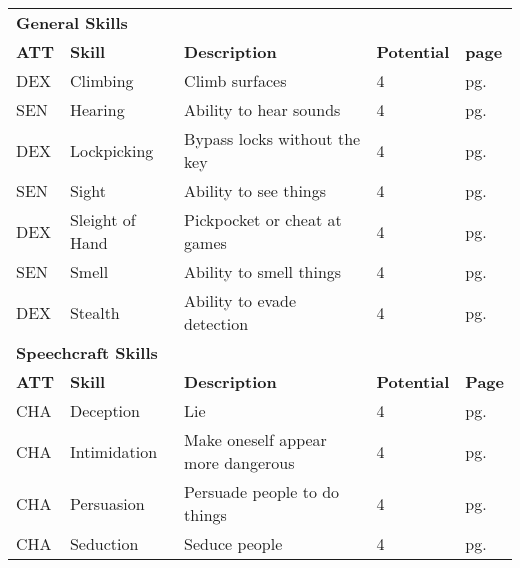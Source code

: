 




\begin{multicols*}{2}
    \begin{table*}[ht]
        \unclassedrowcolors
        \begin{tabularx}{\textwidth}{l l X l l}
            \multicolumn{5}{l}{\bfseries{General Skills}} \\
            \bfseries{ATT} & \bfseries{Skill} & \bfseries{Description} & \bfseries{Potential} & \bfseries{page} \\
            DEX & Climbing & Climb surfaces & 4 & pg. \pageref{skill:climbing} \\
            SEN & Hearing & Ability to hear sounds & 4 & pg. \pageref{skill:hearing} \\
            DEX & Lockpicking & Bypass locks without the key & 4 & pg. \pageref{skill:lockpicking} \\
            SEN & Sight & Ability to see things & 4 & pg. \pageref{skill:sight} \\
            DEX & Sleight of Hand & Pickpocket or cheat at games & 4 & pg. \pageref{skill:sleight-of-hand} \\
            SEN & Smell & Ability to smell things & 4 & pg. \pageref{skill:smell} \\
            DEX & Stealth & Ability to evade detection & 4 & pg. \pageref{skill:stealth} \\
            \multicolumn{5}{l}{\bfseries{Speechcraft Skills}} \\
            \bfseries{ATT} & \bfseries{Skill} & \bfseries{Description} & \bfseries{Potential} & \bfseries{Page} \\
            CHA & Deception & Lie & 4 & pg. \pageref{skill:deception} \\
            CHA & Intimidation & Make oneself appear more dangerous & 4 & pg. \pageref{skill:intimidation} \\
            CHA & Persuasion & Persuade people to do things & 4 & pg. \pageref{skill:persuasion} \\
            CHA & Seduction & Seduce people & 4 & pg. \pageref{skill:seduction} \\

\end{tabularx}
\end{table*}
\end{multicols*}
